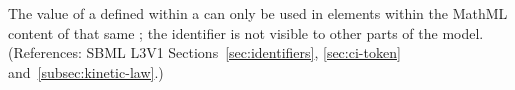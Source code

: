 The  value of a \LocalParameter defined within a \KineticLaw
can only be used in  elements within the MathML content
of that same \KineticLaw; the identifier is not visible to other
parts of the model.  (References: SBML L3V1 Sections~\ref{sec:identifiers},
\ref{sec:ci-token} and~\ref{subsec:kinetic-law}.)
